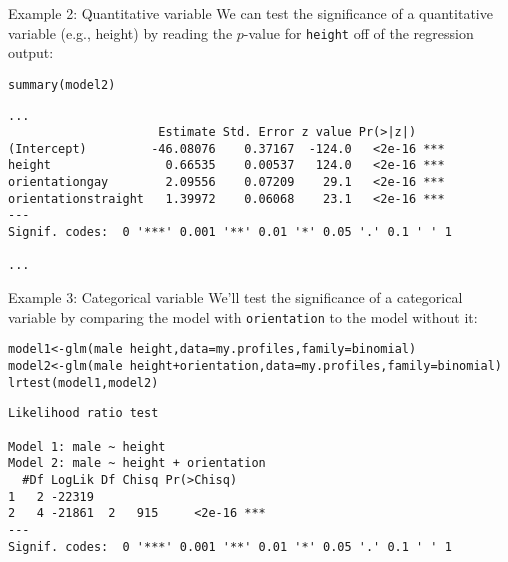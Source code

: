 \documentclass{beamer}\usepackage[]{graphicx}\usepackage[]{color}
\makeatletter
\newcommand{\hlopt}[1]{\textcolor[rgb]{1,0.894,0.769}{#1}}%
\newcommand{\hlstd}[1]{\textcolor[rgb]{1,0.894,0.769}{#1}}%
\newcommand{\hlkwb}[1]{\textcolor[rgb]{0.804,0.776,0.451}{#1}}%
\newcommand{\hlkwc}[1]{\textcolor[rgb]{0.78,0.941,0.545}{#1}}%
\newcommand{\hlkwd}[1]{\textcolor[rgb]{1,0.78,0.769}{#1}}%
\newenvironment{kframe}{%
 \def\at@end@of@kframe{}%
 \ifinner\ifhmode%
  \def\at@end@of@kframe{\end{minipage}}%
  \begin{minipage}{\columnwidth}%
 \fi\fi%
 \def\FrameCommand##1{\hskip\@totalleftmargin \hskip-\fboxsep
 \colorbox{shadecolor}{##1}\hskip-\fboxsep
     \hskip-\linewidth \hskip-\@totalleftmargin \hskip\columnwidth}%
 \MakeFramed {\advance\hsize-\width
   \@totalleftmargin\z@ \linewidth\hsize
   \@setminipage}}%
 {\par\unskip\endMakeFramed%
 \at@end@of@kframe}
\newenvironment{knitrout}{}{} %
\makeatother
\begin{document}
\begin{darkframes}
    \begin{frame}[fragile]{Example 2: Quantitative variable}
      We can test the significance of a quantitative variable (e.g., height) by reading the $p$-value for \texttt{height} off of the regression output:

      \fontvsm
\begin{knitrout}
\begin{kframe}
\begin{alltt}
\hlkwd{summary}\hlstd{(model2)}
\end{alltt}
\begin{verbatim}
...
                     Estimate Std. Error z value Pr(>|z|)    
(Intercept)         -46.08076    0.37167  -124.0   <2e-16 ***
height                0.66535    0.00537   124.0   <2e-16 ***
orientationgay        2.09556    0.07209    29.1   <2e-16 ***
orientationstraight   1.39972    0.06068    23.1   <2e-16 ***
---
Signif. codes:  0 '***' 0.001 '**' 0.01 '*' 0.05 '.' 0.1 ' ' 1

...

\end{verbatim}
\end{kframe}
\end{knitrout}
    \end{frame}

    \begin{frame}[fragile]{Example 3: Categorical variable}
      We'll test the significance of a categorical variable by comparing the model with \texttt{orientation} to the model without it:
      \fontvsm
\begin{knitrout}
\begin{kframe}
\begin{alltt}
\hlstd{model1} \hlkwb{<-} \hlkwd{glm}\hlstd{(male} \hlopt{~} \hlstd{height,} \hlkwc{data}\hlstd{=my.profiles,} \hlkwc{family}\hlstd{=binomial)}
\hlstd{model2} \hlkwb{<-} \hlkwd{glm}\hlstd{(male} \hlopt{~} \hlstd{height} \hlopt{+} \hlstd{orientation,} \hlkwc{data}\hlstd{=my.profiles,} \hlkwc{family}\hlstd{=binomial)}
\hlkwd{lrtest}\hlstd{(model1, model2)}
\end{alltt}
\begin{verbatim}
Likelihood ratio test

Model 1: male ~ height
Model 2: male ~ height + orientation
  #Df LogLik Df Chisq Pr(>Chisq)    
1   2 -22319                        
2   4 -21861  2   915     <2e-16 ***
---
Signif. codes:  0 '***' 0.001 '**' 0.01 '*' 0.05 '.' 0.1 ' ' 1
\end{verbatim}
\end{kframe}
\end{knitrout}
    \end{frame}


\end{darkframes}
\end{document}
